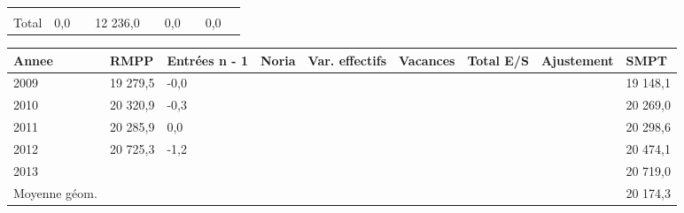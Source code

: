 \begin{longtable}[]{@{}lllllllll@{}}
\begin{minipage}[t]{0.06\columnwidth}
\strut
\end{minipage} & \begin{minipage}[t]{0.13\columnwidth}\raggedright
\strut
\end{minipage} & \begin{minipage}[t]{0.06\columnwidth}\raggedright
\strut
\end{minipage} & \begin{minipage}[t]{0.05\columnwidth}\raggedright
\strut
\end{minipage} & \begin{minipage}[t]{0.06\columnwidth}\raggedright
\strut
\end{minipage}\tabularnewline
\begin{minipage}[t]{0.05\columnwidth}\raggedright
Total\strut
\end{minipage} & \begin{minipage}[t]{0.10\columnwidth}\raggedright
0,0\strut
\end{minipage} & \begin{minipage}[t]{0.06\columnwidth}\raggedright
\strut
\end{minipage} & \begin{minipage}[t]{0.17\columnwidth}\raggedright
12 236,0\strut
\end{minipage} & \begin{minipage}[t]{0.06\columnwidth}\raggedright
\strut
\end{minipage} & \begin{minipage}[t]{0.13\columnwidth}\raggedright
0,0\strut
\end{minipage} & \begin{minipage}[t]{0.06\columnwidth}\raggedright
\strut
\end{minipage} & \begin{minipage}[t]{0.05\columnwidth}\raggedright
0,0\strut
\end{minipage} & \begin{minipage}[t]{0.06\columnwidth}\raggedright
\strut
\end{minipage}\tabularnewline
\bottomrule
\end{longtable}

\begin{longtable}[]{@{}lllllllll@{}}
\toprule
Annee & RMPP & Entrées n - 1 & Noria & Var. effectifs & Vacances & Total
E/S & Ajustement & SMPT\tabularnewline
\midrule
\endhead
2009 & 19 279,5 & -0,0 & & & & & & 19 148,1\tabularnewline
2010 & 20 320,9 & -0,3 & & & & & & 20 269,0\tabularnewline
2011 & 20 285,9 & 0,0 & & & & & & 20 298,6\tabularnewline
2012 & 20 725,3 & -1,2 & & & & & & 20 474,1\tabularnewline
2013 & & & & & & & & 20 719,0\tabularnewline
Moyenne géom. & & & & & & & & 20 174,3\tabularnewline
\bottomrule
\end{longtable}

